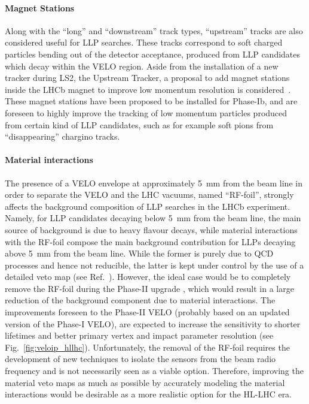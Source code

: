 \paragraph{Magnet Stations}

Along with the ``long'' and ``downstream'' track types, ``upstream'' tracks are also considered useful for LLP searches. These tracks correspond to soft charged particles bending out of the detector acceptance, produced from LLP candidates which decay within the VELO region. Aside from the installation of a new tracker during LS2, the Upstream Tracker, a proposal to add magnet stations inside the LHCb magnet to improve low momentum resolution is considered~\cite{Aaij:2244311}. These magnet stations have been proposed to be installed for Phase-Ib, and are foreseen to highly improve the tracking of low momentum particles produced from certain kind of LLP candidates, such as for example soft pions from ``disappearing'' chargino tracks.

\paragraph{Material interactions}

The presence of a VELO envelope at approximately 5~mm from the beam line in order to separate the VELO and the LHC vacuums, named ``RF-foil'', strongly affects the background composition of LLP searches in the LHCb experiment. Namely, for LLP candidates decaying below 5~mm from the beam line, the main source of background is due to heavy flavour decays, while material interactions with the RF-foil compose the main background contribution for LLPs decaying above 5~mm from the beam line. While the
former is purely due to QCD processes and hence not reducible, the latter is kept under control by the use of a detailed veto map (see Ref.~\cite{Aaij:2017rft}). However, the ideal case would be to completely remove the RF-foil during the Phase-II upgrade \cite{Aaij:2244311}, which would result in a large reduction of the background component due to material interactions. The improvements foreseen to the Phase-II VELO (probably based on an updated
version of the Phase-I VELO), are expected to increase the sensitivity to shorter lifetimes and better primary vertex and impact parameter resolution (see Fig.~\ref{fig:veloip_hllhc}). Unfortunately, the removal of the RF-foil requires the development of new techniques to isolate the sensors from the beam radio frequency and is not necessarily seen as a viable option. Therefore, improving the material veto maps as much as possible by accurately modeling the material interactions would be desirable as a more realistic option for the HL-LHC era.


